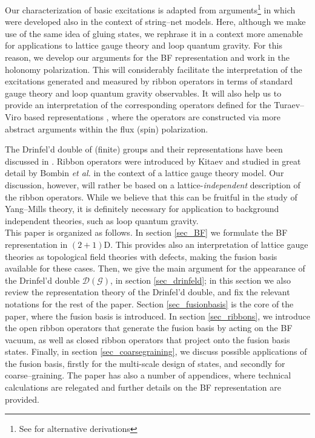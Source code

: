 \documentclass[nofootinbib,superscriptaddress,eqsecnum,tightenlines,11pt]{revtex4-1}
\begin{document}
Our characterization of basic excitations is adapted from arguments\footnote{See \cite{Kong} for alternative derivations} in \cite{Ocneanu, Lan} which were developed  also in the context of string--net models. Here, although we make use of the same idea of gluing states, we rephrase it in a context more amenable for applications to lattice gauge theory and loop quantum gravity. For this reason, we develop our arguments for the BF representation \cite{DG14a,BDG15} and work in the holonomy polarization. This will considerably facilitate the interpretation of the excitations generated and measured by ribbon operators in terms of standard gauge theory and loop quantum gravity observables. It will also help us to provide an interpretation of the corresponding operators defined for the Turaev--Viro based representations \cite{DG16}, where the operators are constructed via more abstract arguments within the flux (spin) polarization.

The Drinfel'd double of (finite) groups and their representations have been discussed in \cite{Verlinde,BaisReview}.  Ribbon operators were introduced by Kitaev \cite{Kitaev1} and studied in great detail by Bombin \textit{et al.} \cite{Bombin} in the context of a lattice gauge theory model. Our discussion, however, will rather be based on a lattice-\textit{independent} description of the ribbon operators. While we believe that this can be fruitful in the study of Yang--Mills theory, it is definitely necessary for application to background independent theories, such as loop quantum gravity.
~\\

This paper is organized as follows. In section \ref{sec_BF} we formulate the BF representation in $(2+1)$D. This provides also an interpretation of lattice gauge theories as topological field theories with defects, making the fusion basis available for these cases.
%
Then, we give the main argument for the appearance of the Drinfel'd double $\mathcal{D}(\mathcal{G})$, in section \ref{sec_drinfeld};
in this section we also review the representation theory of the Drinfel'd double, and fix the relevant notations for the rest of the paper.
Section \ref{sec_fusionbasis} is the core of the paper, where the fusion basis  is introduced.
In section \ref{sec_ribbons}, we introduce the open ribbon operators that generate the fusion basis by acting on the BF vacuum, as well as closed ribbon operators that project onto the fusion basis states.
 Finally, in section \ref{sec_coarsegraining}, we discuss possible applications of the fusion basis, firstly for the multi-scale design of states, and secondly for coarse--graining. 
The paper has also a number of appendices, where technical calculations are relegated and further details on the BF representation are provided. 
\end{document}
